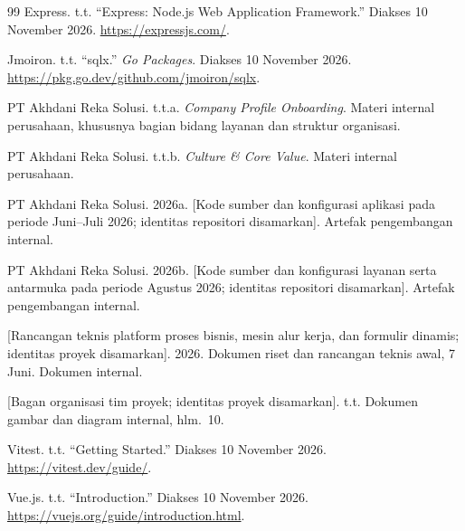 \renewcommand{\bibname}{Referensi}
\renewcommand{\bibsection}{\chapter*{Referensi}\phantomsection\addcontentsline{toc}{chapter}{Referensi}}
\begin{thebibliography}{99}
Express. t.t. ``Express: Node.js Web Application Framework.'' Diakses 10 November 2026. \url{https://expressjs.com/}.

Jmoiron. t.t. ``sqlx.'' \textit{Go Packages}. Diakses 10 November 2026. \url{https://pkg.go.dev/github.com/jmoiron/sqlx}.

PT Akhdani Reka Solusi. t.t.a. \textit{Company Profile Onboarding}. Materi internal perusahaan, khususnya bagian bidang layanan dan struktur organisasi.

PT Akhdani Reka Solusi. t.t.b. \textit{Culture \& Core Value}. Materi internal perusahaan.

PT Akhdani Reka Solusi. 2026a. [Kode sumber dan konfigurasi aplikasi pada periode Juni--Juli 2026; identitas repositori disamarkan]. Artefak pengembangan internal.

PT Akhdani Reka Solusi. 2026b. [Kode sumber dan konfigurasi layanan serta antarmuka pada periode Agustus 2026; identitas repositori disamarkan]. Artefak pengembangan internal.

[Rancangan teknis platform proses bisnis, mesin alur kerja, dan formulir dinamis; identitas proyek disamarkan]. 2026. Dokumen riset dan rancangan teknis awal, 7 Juni. Dokumen internal.

[Bagan organisasi tim proyek; identitas proyek disamarkan]. t.t. Dokumen gambar dan diagram internal, hlm.~10.

Vitest. t.t. ``Getting Started.'' Diakses 10 November 2026. \url{https://vitest.dev/guide/}.

Vue.js. t.t. ``Introduction.'' Diakses 10 November 2026. \url{https://vuejs.org/guide/introduction.html}.
\end{thebibliography}
